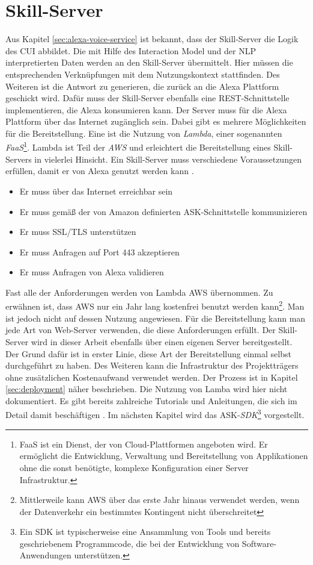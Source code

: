 \section{Skill-Server}
\label{sec:skill-server}
Aus Kapitel \ref{sec:alexa-voice-service} ist bekannt, dass der Skill-Server die Logik des \ac{CUI} abbildet. Die mit Hilfe des Interaction Model und der \ac{NLP} interpretierten Daten werden an den Skill-Server übermittelt. Hier müssen die entsprechenden Verknüpfungen mit dem Nutzungskontext stattfinden. Des Weiteren ist die Antwort zu generieren, die zurück an die Alexa Plattform geschickt wird. Dafür muss der Skill-Server ebenfalls eine \ac{REST}-Schnittstelle implementieren, die Alexa konsumieren kann. Der Server muss für die Alexa Plattform über das Internet zugänglich sein. Dabei gibt es mehrere Möglichkeiten für die Bereitstellung. Eine ist die Nutzung von \textit{Lambda}, einer sogenannten \textit{\ac{FaaS}}\footnote{FaaS ist ein Dienst, der von Cloud-Plattformen angeboten wird. Er ermöglicht die Entwicklung, Verwaltung und Bereitstellung von Applikationen ohne die sonst benötigte, komplexe Konfiguration einer Server Infrastruktur.}. Lambda ist Teil der \textit{\ac{AWS}} und erleichtert die Bereitstellung eines Skill-Servers in vielerlei Hinsicht. Ein Skill-Server muss verschiedene Voraussetzungen erfüllen, damit er von Alexa genutzt werden kann \cite{alexa-verify-request}.

\begin{itemize}
    \item Er muss über das Internet erreichbar sein
    \item Er muss gemäß der von Amazon definierten \ac{ASK}-Schnittstelle kommunizieren
    \item Er muss \ac{SSL}/\ac{TLS} unterstützen
    \item Er muss Anfragen auf Port 443 akzeptieren
    \item Er muss Anfragen von Alexa validieren
\end{itemize}

Fast alle der Anforderungen werden von Lambda \bzw \ac{AWS} übernommen. Zu erwähnen ist, dass \ac{AWS} nur ein Jahr lang kostenfrei benutzt werden kann\footnote{Mittlerweile kann AWS über das erste Jahr hinaus verwendet werden, wenn der Datenverkehr ein bestimmtes Kontingent nicht überschreitet}. Man ist jedoch nicht auf dessen Nutzung angewiesen. Für die Bereitstellung kann man jede Art von Web-Server verwenden, die diese Anforderungen erfüllt. Der Skill-Server wird in dieser Arbeit ebenfalls über einen eigenen Server bereitgestellt. Der Grund dafür ist in erster Linie, diese Art der Bereitstellung einmal selbst durchgeführt zu haben. Des Weiteren kann die Infrastruktur des Projektträgers ohne zusätzlichen Kostenaufwand verwendet werden. Der Prozess ist in Kapitel \ref{sec:deployment} näher beschrieben. Die Nutzung von Lamba wird hier nicht dokumentiert. Es gibt bereits zahlreiche Tutorials und Anleitungen, die sich im Detail damit beschäftigen \cite{aws-lambda}. Im nächsten Kapitel wird das \ac{ASK}-\textit{\ac{SDK}}\footnote{Ein \ac{SDK} ist typischerweise eine Ansammlung von Tools und bereits geschriebenem Programmcode, die bei der Entwicklung von Software-Anwendungen unterstützen.} vorgestellt. 

